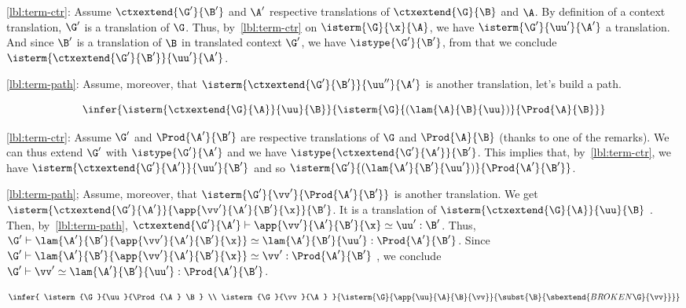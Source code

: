 \eqref{lbl:term-ctr}: Assume $\ctxextend{\G'}{\B'}$ and $\A'$
respective translations of $\ctxextend{\G}{\B}$ and $\A$.
By definition of a context translation, $\G'$ is a translation of $\G$.
Thus, by~\eqref{lbl:term-ctr} on $\isterm{\G}{\x}{\A}$, we have
$\isterm{\G'}{\uu'}{\A'}$ a translation.
And since $\B'$ is a translation of $\B$ in translated context $\G'$,
we have $\istype{\G'}{\B'}$, from that we conclude
$\isterm{\ctxextend{\G'}{\B'}}{\uu'}{\A'}$.

\eqref{lbl:term-path}: Assume, moreover, that
$\isterm{\ctxextend{\G'}{\B'}}{\uu''}{\A'}$
is another translation, let's build a path.



\begin{equation*}
  \infer
  {\isterm{\ctxextend{\G}{\A}}{\uu}{\B}}
  {\isterm{\G}{(\lam{\A}{\B}{\uu})}{\Prod{\A}{\B}}}
\end{equation*}

\eqref{lbl:term-ctr}: Assume $\G'$ and $\Prod{\A'}{\B'}$ are respective
translations of $\G$ and $\Prod{\A}{\B}$ (thanks to one of the remarks).
We can thus extend $\G'$ with $\istype{\G'}{\A'}$ and we have
$\istype{\ctxextend{\G'}{\A'}}{\B'}$.
This implies that, by~\eqref{lbl:term-ctr}, we have
$\isterm{\ctxextend{\G'}{\A'}}{\uu'}{\B'}$
and so
$\isterm{\G'}{(\lam{\A'}{\B'}{\uu'})}{\Prod{\A'}{\B'}}$.

\eqref{lbl:term-path}; Assume, moreover, that
$\isterm{\G'}{\vv'}{\Prod{\A'}{\B'}}$ is another translation.
We get $\isterm{\ctxextend{\G'}{\A'}}{\app{\vv'}{\A'}{\B'}{\x}}{\B'}$.
It is a translation of $\isterm{\ctxextend{\G}{\A}}{\uu}{\B}$
.
Then, by~\eqref{lbl:term-path},
$\ctxextend{\G'}{\A'} \vdash \app{\vv'}{\A'}{\B'}{\x} \simeq
\uu' : \B'$.
Thus,
$\G' \vdash \lam{\A'}{\B'}{\app{\vv'}{\A'}{\B'}{\x}} \simeq
\lam{\A'}{\B'}{\uu'} : \Prod{\A'}{\B'}$.
Since $\G' \vdash \lam{\A'}{\B'}{\app{\vv'}{\A'}{\B'}{\x}} \simeq
\vv' : \Prod{\A'}{\B'}$ ,
we conclude
$\G' \vdash \vv' \simeq \lam{\A'}{\B'}{\uu'} : \Prod{\A'}{\B'}$.



\begin{equation*}
  \infer{
    \isterm{\G}{\uu}{\Prod{\A} \B} \\
    \isterm{\G}{\vv}{\A}
  }{
    \isterm
      {\G}
      {\app{\uu}{\A}{\B}{\vv}}
      {\subst{\B}{\sbextend{BROKEN{\G}}{\vv}}}
  }
\end{equation*}

